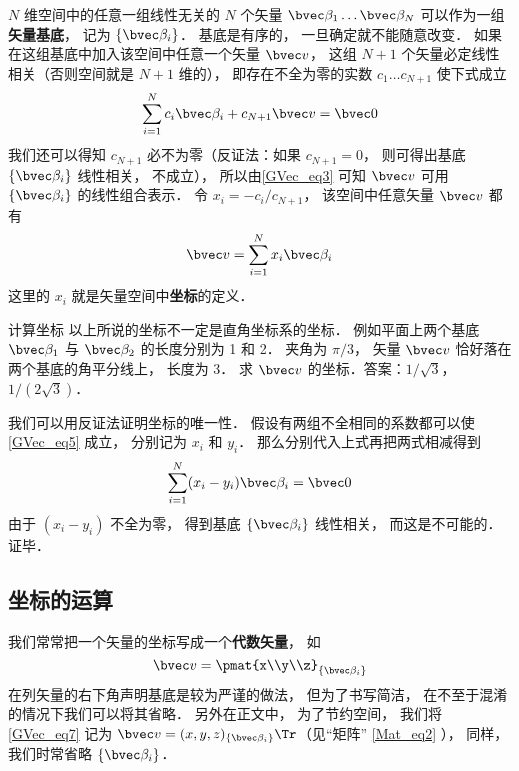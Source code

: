 $N$ 维空间中的任意一组线性无关的 $N$ 个矢量 $\bvec \beta_1\dots \bvec \beta_N$ 可以作为一组\textbf{矢量基底}， 记为 $\{\bvec \beta_i\}$． 基底是有序的， 一旦确定就不能随意改变． 如果在这组基底中加入该空间中任意一个矢量 $\bvec v$， 这组 $N+1$ 个矢量必定线性相关（否则空间就是 $N+1$ 维的）， 即存在不全为零的实数 $c_1\dots c_{N+1}$ 使下式成立
\begin{equation}
\sum_{i=1}^N c_i \bvec \beta_i + c_{N+1} \bvec v = \bvec 0
\end{equation}
我们还可以得知 $c_{N+1}$ 必不为零（反证法：如果 $c_{N+1} = 0$， 则可得出基底 $\{\bvec \beta_i\}$ 线性相关， 不成立）， 所以由\autoref{GVec_eq3} 可知 $\bvec v$ 可用 $\{\bvec \beta_i\}$ 的线性组合表示． 令 $x_i = -c_i/c_{N+1}$， 该空间中任意矢量 $\bvec v$ 都有
\begin{equation}\label{GVec_eq5}
\bvec v = \sum_{i=1}^N x_i \bvec \beta_i
\end{equation}
这里的 $x_i$ 就是矢量空间中\textbf{坐标}的定义．

\begin{exercise}{计算坐标}
以上所说的坐标不一定是直角坐标系的坐标． 例如平面上两个基底 $\bvec \beta_1$ 与 $\bvec \beta_2$ 的长度分别为 1 和 2． 夹角为 $\pi/3$， 矢量 $\bvec v$ 恰好落在两个基底的角平分线上， 长度为 3． 求 $\bvec v$ 的坐标．答案：$1/\sqrt 3$， $1/(2\sqrt 3)$．
\end{exercise}

我们可以用反证法证明坐标的唯一性． 假设有两组不全相同的系数都可以使\autoref{GVec_eq5} 成立， 分别记为 $x_i$ 和 $y_i$． 那么分别代入上式再把两式相减得到
\begin{equation}
\sum_{i=1}^N (x_i-y_i) \bvec \beta_i = \bvec 0
\end{equation}
由于 $(x_i-y_i)$ 不全为零， 得到基底 $\{\bvec \beta_i\}$ 线性相关， 而这是不可能的．证毕．

\subsection{坐标的运算}
我们常常把一个矢量的坐标写成一个\textbf{代数矢量}， 如
\begin{equation}\label{GVec_eq7}
\bvec v = \pmat{x\\y\\z}_{\{\bvec\beta_i\}}
\end{equation}
在列矢量的右下角声明基底是较为严谨的做法， 但为了书写简洁， 在不至于混淆的情况下我们可以将其省略． 另外在正文中， 为了节约空间， 我们将\autoref{GVec_eq7} 记为 $\bvec v = (x, y, z)_{\{\bvec\beta_i\}}\Tr$（见“矩阵” \autoref{Mat_eq2} ）， 同样， 我们时常省略 $\{\bvec\beta_i\}$．

